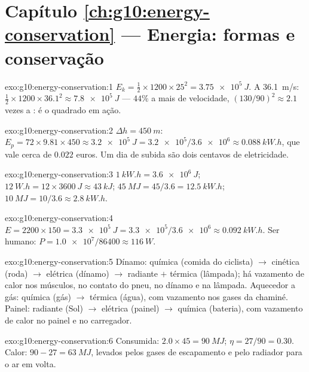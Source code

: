\section*{Capítulo \ref{ch:g10:energy-conservation} --- Energia: formas e conservação}

\begin{solution}{exo:g10:energy-conservation:1}
$E_k = \tfrac12 \times 1200 \times 25^2 = \qty{3.75e5}{J}$. A
\qty{36.1}{m/s}:
$\tfrac12 \times 1200 \times 36.1^2 \approx \qty{7.8e5}{J}$ --- $44\%$ a
mais de velocidade, $(130/90)^2 \approx 2.1$ vezes a : é
o quadrado em ação.
\end{solution}

\begin{solution}{exo:g10:energy-conservation:2}
$\Delta h = \qty{450}{m}$:
$E_p = 72 \times 9.81 \times 450 \approx \qty{3.2e5}{J}
= \num{3.2e5}/\num{3.6e6} \approx \qty{0.088}{kW.h}$, que vale cerca de
$0.022$ euros. Um dia de subida são dois centavos de eletricidade.
\end{solution}

\begin{solution}{exo:g10:energy-conservation:3}
$\qty{1}{kW.h} = \qty{3.6e6}{J}$;
$\qty{12}{W.h} = 12 \times \qty{3600}{J} \approx \qty{43}{kJ}$;
$\qty{45}{MJ} = 45/3.6 = \qty{12.5}{kW.h}$;
$\qty{10}{MJ} = 10/3.6 \approx \qty{2.8}{kW.h}$.
\end{solution}

\begin{solution}{exo:g10:energy-conservation:4}
$E = 2200 \times 150 = \qty{3.3e5}{J}
= \num{3.3e5}/\num{3.6e6} \approx \qty{0.092}{kW.h}$. Ser humano:
$P = \num{1.0e7}/\num{86400} \approx \qty{116}{W}$.
\end{solution}

\begin{solution}{exo:g10:energy-conservation:5}
Dínamo: química (comida do ciclista) $\to$ cinética (roda) $\to$ elétrica
(dínamo) $\to$ radiante $+$ térmica (lâmpada); há vazamento de calor nos
músculos, no contato do pneu, no dínamo e na lâmpada. Aquecedor a gás:
química (gás) $\to$ térmica (água), com vazamento nos gases da chaminé.
Painel: radiante (Sol) $\to$ elétrica (painel) $\to$ química (bateria),
com vazamento de calor no painel e no carregador.
\end{solution}

\begin{solution}{exo:g10:energy-conservation:6}
Consumida: $2.0 \times 45 = \qty{90}{MJ}$; $\eta = 27/90 = 0.30$. Calor:
$90 - 27 = \qty{63}{MJ}$, levados pelos gases de escapamento e pelo
radiador para o ar em volta.
\end{solution}

